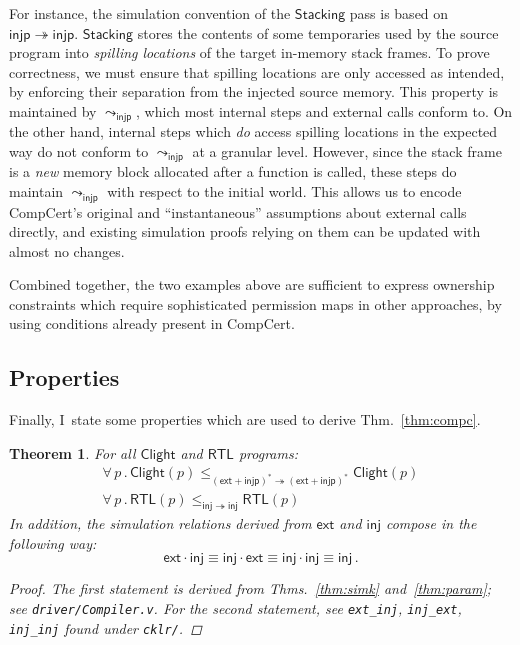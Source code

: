 \documentclass[11pt,oneside]{book}
\newtheorem{theorem}{Theorem}[chapter]
\theoremstyle{definition}
\newcommand{\kw}[1]{\ensuremath{ \mathsf{#1} }}
\begin{document}
For instance,
the simulation convention of the \kw{Stacking} pass
is based on $\kw{injp} \twoheadrightarrow \kw{injp}$.
\kw{Stacking} stores the contents of some
temporaries used by the source program
into \emph{spilling locations}
of the target in-memory stack frames.
To prove correctness,
we must ensure that spilling locations
are only accessed as intended,
by enforcing their separation
from the injected source memory.
%
This property is maintained by $\leadsto_\kw{injp}$,
which most internal steps and external calls conform to.
On the other hand,
internal steps which \emph{do} access spilling locations
in the expected way
do not conform to $\leadsto_\kw{injp}$ at a granular level.
However,
since the stack frame is a \emph{new}
memory block allocated after a function is called,
these steps do maintain $\leadsto_\kw{injp}$
with respect to the initial world.
This allows us to encode CompCert's original and
``instantaneous'' assumptions about external calls directly,
and existing simulation proofs relying on them
can be updated with almost no changes.

Combined together,
the two examples above are sufficient to express
ownership constraints which require
sophisticated permission maps in other approaches,
by using conditions already present in CompCert.


\subsection{Properties} \label{sec:cklr-props} %

Finally,
I~state some properties which are used
to derive Thm.~\ref{thm:compc}.

\begin{theorem} \label{thm:cklr-props}
For all $\kw{Clight}$ and $\kw{RTL}$ programs:
\begin{gather*}
\forall \, p \,.\,
  \kw{Clight}(p)
  \le_{(\kw{ext} + \kw{injp})^* \twoheadrightarrow (\kw{ext} + \kw{injp})^*}
  \kw{Clight}(p) \\
\forall \, p \,.\,
  \kw{RTL}(p)
  \le_{\kw{inj} \twoheadrightarrow \kw{inj}}
  \kw{RTL}(p)
\end{gather*}
In addition,
the simulation relations derived from $\kw{ext}$ and $\kw{inj}$
compose in the following way:
\[
  \kw{ext} \cdot \kw{inj} \equiv
  \kw{inj} \cdot \kw{ext} \equiv
  \kw{inj} \cdot \kw{inj} \equiv
  \kw{inj} \,.
\]
\begin{proof}
The first statement is derived from
Thms.~\ref{thm:simk} and~\ref{thm:param};
see \texttt{driver/Compiler.v}.
For the second statement, see
\texttt{ext\_inj}, \texttt{inj\_ext}, \texttt{inj\_inj}
found under \texttt{cklr/}.
\end{proof}
\end{theorem}
\end{document}
